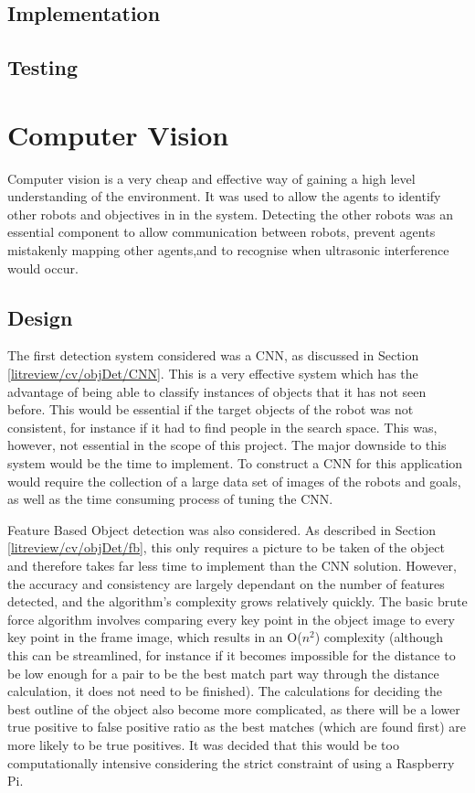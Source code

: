 \subsection{Implementation}\label{soft/SLAM/impl}

\subsection{Testing}\label{soft/SLAM/test}



\section{Computer Vision}\label{soft/cv}
Computer vision is a very cheap and effective way of gaining a high level understanding of the environment. It was used to allow the agents to identify other robots and objectives in in the system. Detecting the other robots was an essential component to allow communication between robots, prevent agents mistakenly mapping other agents,and to recognise when ultrasonic interference would occur.

\subsection{Design}\label{soft/cv/design}
The first detection system considered was a CNN, as discussed in Section \ref{litreview/cv/objDet/CNN}. This is a very effective system which has the advantage of
being able to classify instances of objects that it has not
seen before. This would be essential if the target objects of
the robot was not consistent, for instance if it had to find
people in the search space. This was, however, not essential
in the scope of this project. The major downside to this
system would be the time to implement. To construct a CNN for
this application would require the collection of a large data
set of images of the robots and goals, as well as the time
consuming process of tuning the CNN.

Feature Based Object detection was also considered. As described in Section \ref{litreview/cv/objDet/fb}, this only requires a picture to be taken of the object and therefore takes far less time to
implement than the CNN solution. However, the accuracy and
consistency are largely dependant on the number of features
detected, and the algorithm's complexity grows relatively
quickly. The basic brute force algorithm involves comparing
every key point in the object image to every key point in the
frame image, which results in an O($n^2$) complexity (although
this can be streamlined, for instance if it becomes impossible
for the distance to be low enough for a pair to be the best
match part way through the distance calculation, it does not
need to be finished). The calculations for deciding the best
outline of the object also become more complicated, as there
will be a lower true positive to false positive ratio as the
best matches (which are found first) are more likely to be
true positives. It was decided that this would be too
computationally intensive considering the strict constraint of
using a Raspberry Pi.

